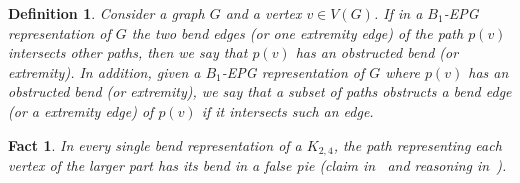 \documentclass[9pt]{entcs}
\newtheorem{lema}{Lemma}[section]
\newtheorem{defi}{Definition}[section]
\newtheorem{fac}{Fact}[section]
\newtheorem{prove}{Proof}[section]
\begin{document}




\begin{defi}
Consider a graph $G$ and a vertex $v \in V(G)$. If in a $B_1$-EPG representation of $G$ the two bend edges (or one extremity edge) of the path $p(v)$ intersects other paths, then we say that $p(v)$ has an \emph{obstructed bend (or extremity)}. 
In addition, given a $B_1$-EPG representation of $G$ where $p(v)$ has an obstructed bend (or extremity), we say that a subset of paths \emph{obstructs} a bend edge (or a extremity edge) of $p(v)$ if it intersects such an edge. 
\end{defi}


\begin{fac} \label{fact:k24facts}
In every single bend representation of a $K_{2,4}$, the path representing each vertex of the larger part has its bend in a false pie (claim in~\cite{daniel2014b} and reasoning in~\cite{Asinowski2009}).
\end{fac}




\end{document}
